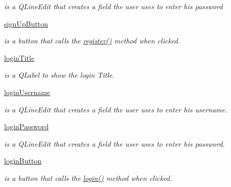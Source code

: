 \begin{DoxyCompactItemize}
\begin{DoxyCompactList}\small\item\em is a Q\+Line\+Edit that creates a field the user uses to enter his password \end{DoxyCompactList}\item 
\hyperlink{classsrc_1_1login__menu_1_1_login_menu_a2d518012477c43a0d5b77385e2e4209f}{sign\+Up\+Button}
\begin{DoxyCompactList}\small\item\em is a button that calls the \hyperlink{classsrc_1_1login__menu_1_1_login_menu_af6ee6a8dee90f1a94a506400356707ad}{register()} method when clicked. \end{DoxyCompactList}\item 
\hyperlink{classsrc_1_1login__menu_1_1_login_menu_adce86324539cbf7d5a398d8afba6a439}{login\+Title}
\begin{DoxyCompactList}\small\item\em is a Q\+Label to show the login Title. \end{DoxyCompactList}\item 
\hyperlink{classsrc_1_1login__menu_1_1_login_menu_a762640516f0435f5764308fd0f00a6c9}{login\+Username}
\begin{DoxyCompactList}\small\item\em is a Q\+Line\+Edit that creates a field the user uses to enter his username. \end{DoxyCompactList}\item 
\hyperlink{classsrc_1_1login__menu_1_1_login_menu_a6c0c5ab8b48e62ccb26a472e6e7790c9}{login\+Password}
\begin{DoxyCompactList}\small\item\em is a Q\+Line\+Edit that creates a field the user uses to enter his password. \end{DoxyCompactList}\item 
\hyperlink{classsrc_1_1login__menu_1_1_login_menu_a6e91fe2dc9a5b4bb26019242e84ce986}{login\+Button}
\begin{DoxyCompactList}\small\item\em is a button that calls the \hyperlink{classsrc_1_1login__menu_1_1_login_menu_a75303935e17e43388fd4ef3df029944e}{login()} method when clicked. \end{DoxyCompactList}\end{DoxyCompactItemize}
